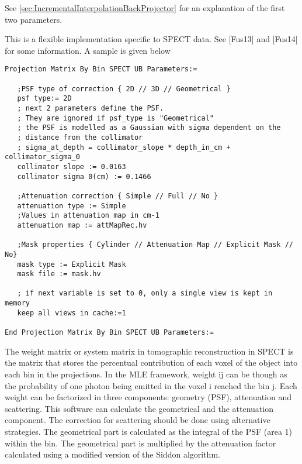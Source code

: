 \documentclass{article}
\begin{document}
See \ref{sec:IncrementalInterpolationBackProjector} for an explanation 
of the first two parameters.

{ 
}
\label{sec:projmatrixSPECTUB}
This is a flexible implementation specific to SPECT data. See [Fus13] and [Fus14] for some information.
A sample is given below

\begin{verbatim}
Projection Matrix By Bin SPECT UB Parameters:=

   ;PSF type of correction { 2D // 3D // Geometrical }
   psf type:= 2D
   ; next 2 parameters define the PSF. 
   ; They are ignored if psf_type is "Geometrical"
   ; the PSF is modelled as a Gaussian with sigma dependent on the 
   ; distance from the collimator
   ; sigma_at_depth = collimator_slope * depth_in_cm + collimator_sigma_0
   collimator slope := 0.0163
   collimator sigma 0(cm) := 0.1466

   ;Attenuation correction { Simple // Full // No }
   attenuation type := Simple
   ;Values in attenuation map in cm-1
   attenuation map := attMapRec.hv

   ;Mask properties { Cylinder // Attenuation Map // Explicit Mask // No}
   mask type := Explicit Mask
   mask file := mask.hv

   ; if next variable is set to 0, only a single view is kept in memory
   keep all views in cache:=1

End Projection Matrix By Bin SPECT UB Parameters:=
\end{verbatim}

The weight matrix or system matrix in tomographic reconstruction in SPECT is the matrix that stores the
percentual contribution of each voxel of the object into each bin in the projections. In the MLE
framework, weight ij can be though as the probability of one photon being emitted in the voxel i reached
the bin j. Each weight can be factorized in three components: geometry (PSF), attenuation and scattering.
This software can calculate the geometrical and the attenuation component. The correction for scattering
should be done using alternative strategies. The geometrical part is calculated as the integral of the
PSF (area 1) within the bin. The geometrical part is multiplied by the attenuation factor calculated
using a modified version of the Siddon algorithm.  

{ 
}
\end{document}
